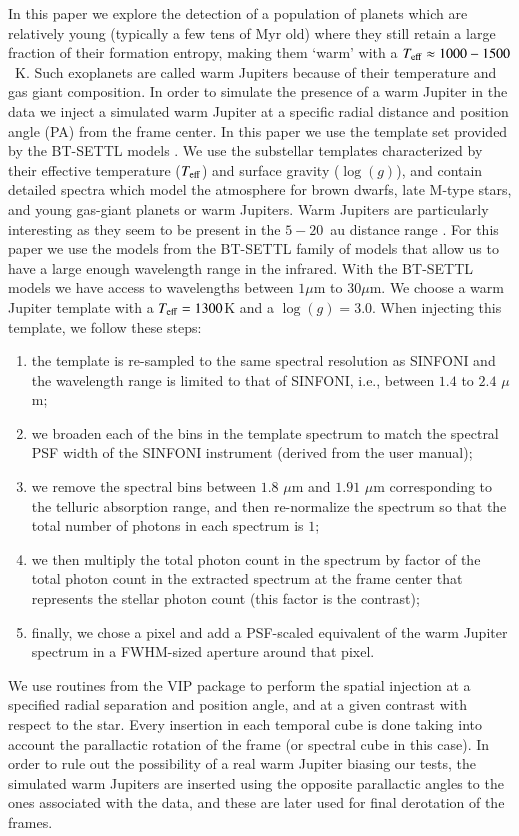 \documentclass{aa}
\begin{document}
In this paper we explore the detection of a population of planets which are relatively young (typically a few tens of Myr old) where they still retain a large fraction of their formation entropy, making them `warm' with a $T_{\rm eff}\approx 1000 - 1500$~K.
Such exoplanets are called warm Jupiters because of their temperature and gas giant composition.
In order to simulate the presence of a warm Jupiter in the data we inject a simulated warm Jupiter at a specific radial distance and position angle (PA) from the frame center.
In this paper we use the template set provided by the BT-SETTL models \citep{1997Allard, 2011Allard}. 
We use the substellar templates characterized by their effective temperature ($T_{\rm{eff}}$) and surface gravity ($\log(g)$), and contain detailed spectra which model the atmosphere for brown dwarfs, late M-type stars, and young gas-giant planets or warm Jupiters.
Warm Jupiters are particularly interesting as they seem to be present in the $5-20$~au distance range \cite{2016Bryan}.
For this paper we use the models from the BT-SETTL family of models \citep[][]{2003BTsettl} that allow us to have a large enough wavelength range in the infrared. 
With the BT-SETTL models we have access to wavelengths between $1\mu$m to $30\mu$m.
We choose a warm Jupiter template with a $T_{\rm eff} = 1300$K and a $\log(g)=3.0$.
When injecting this template, we follow these steps:
\begin{enumerate}
    \item the template is re-sampled to the same spectral resolution as SINFONI and the wavelength range is limited to that of SINFONI, i.e., between $1.4$ to $2.4$ $\mu$m;
    \item we broaden each of the bins in the template spectrum to match the spectral PSF width of the SINFONI instrument (derived from the user manual);
    \item we remove the spectral bins between $1.8$ $\mu$m and $1.91$ $\mu$m corresponding to the telluric absorption range, and then re-normalize the spectrum so that the total number of photons in each spectrum is $1$;
    \item we then multiply the total photon count in the spectrum by factor of the total photon count in the extracted spectrum at the frame center that represents the stellar photon count (this factor is the contrast);
    \item finally, we chose a pixel and add a PSF-scaled equivalent of the warm Jupiter spectrum in a FWHM-sized aperture around that pixel.
\end{enumerate}
We use routines from the \textsc{VIP} package to perform the spatial injection at a specified radial separation and position angle, and at a given contrast with respect to the star.
Every insertion in each temporal cube is done taking into account the parallactic rotation of the frame (or spectral cube in this case).
In order to rule out the possibility of a real warm Jupiter biasing our tests, the simulated warm Jupiters are inserted using the opposite parallactic angles to the ones associated with the data, and these are later used for final derotation of the frames.
\end{document}
